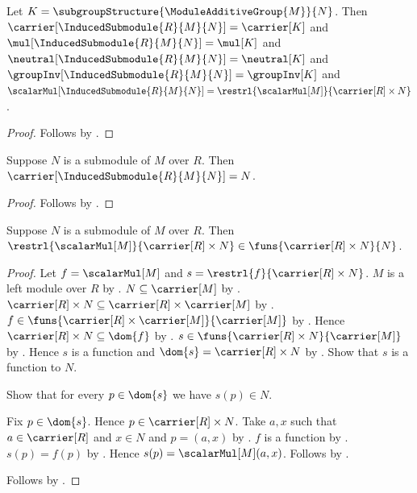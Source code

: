 \begin{proposition}\label{induced_submodule_fields}
    Let $K=\subgroupStructure{\ModuleAdditiveGroup{M}}{N}$.
    Then
        $\carrier[\InducedSubmodule{R}{M}{N}]=\carrier[K]$ and
        $\mul[\InducedSubmodule{R}{M}{N}]=\mul[K]$ and
        $\neutral[\InducedSubmodule{R}{M}{N}]=\neutral[K]$ and
        $\groupInv[\InducedSubmodule{R}{M}{N}]=\groupInv[K]$ and
        $\scalarMul[\InducedSubmodule{R}{M}{N}]
            =\restrl{\scalarMul[M]}{\carrier[R]\times N}$.
\end{proposition}
\begin{proof}
    Follows by
        .
\end{proof}

\begin{proposition}\label{induced_submodule_carrier}
    Suppose $N$ is a submodule of $M$ over $R$.
    Then $\carrier[\InducedSubmodule{R}{M}{N}]=N$.
\end{proposition}
\begin{proof}
    Follows by
        .
\end{proof}

\begin{proposition}\label{induced_submodule_scalar_graph}
    Suppose $N$ is a submodule of $M$ over $R$.
    Then
        $\restrl{\scalarMul[M]}{\carrier[R]\times N}
            \in\funs{\carrier[R]\times N}{N}$.
\end{proposition}
\begin{proof}
    Let $f=\scalarMul[M]$ and
        $s=\restrl{f}{\carrier[R]\times N}$.
    $M$ is a left module over $R$ by .
    $N\subseteq\carrier[M]$ by .
    $\carrier[R]\times N
        \subseteq\carrier[R]\times\carrier[M]$ by
        .
    $f\in\funs{\carrier[R]\times\carrier[M]}{\carrier[M]}$ by
        .
    Hence $\carrier[R]\times N\subseteq\dom{f}$ by .
    $s\in\funs{\carrier[R]\times N}{\carrier[M]}$ by
        .
    Hence $s$ is a function and
        $\dom{s}=\carrier[R]\times N$ by .
    Show that $s$ is a function to $N$.
    \begin{subproof}
        Show that for every $p\in\dom{s}$ we have $s(p)\in N$.
        \begin{subproof}
            Fix $p\in\dom{s}$.
            Hence $p\in\carrier[R]\times N$.
            Take $a,x$ such that $a\in\carrier[R]$ and $x\in N$ and
                $p=(a,x)$ by .
            $f$ is a function by .
            $s(p)=f(p)$ by .
            Hence $s(p)=\scalarMul[M](a,x)$.
            Follows by .
        \end{subproof}
    \end{subproof}
    Follows by .
\end{proof}

